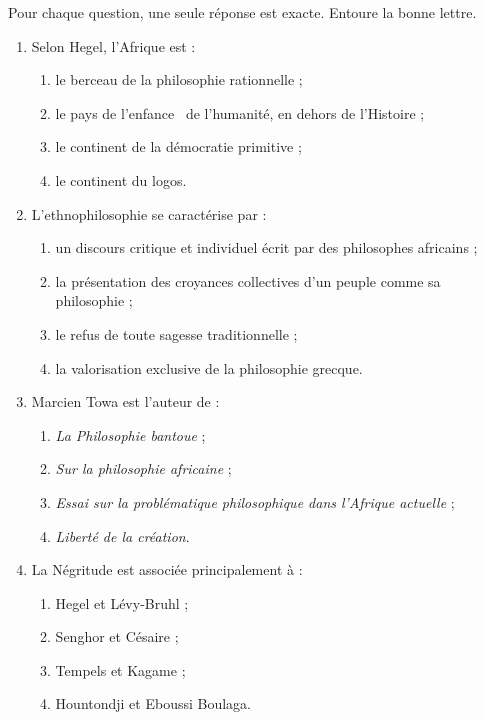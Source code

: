 \documentclass[11pt]{article}
\begin{document}
\begin{exercice}
Pour chaque question, une seule réponse est exacte. Entoure la bonne lettre.
\begin{enumerate}
\item Selon Hegel, l'Afrique est :
\begin{enumerate}
\item le berceau de la philosophie rationnelle ;
\item \guillemotleft le pays de l'enfance \guillemotright\ de l'humanité, en dehors de l'Histoire ;
\item le continent de la démocratie primitive ;
\item le continent du logos.
\end{enumerate}
\item L'ethnophilosophie se caractérise par :
\begin{enumerate}
\item un discours critique et individuel écrit par des philosophes africains ;
\item la présentation des croyances collectives d'un peuple comme sa \guillemotleft philosophie \guillemotright ;
\item le refus de toute sagesse traditionnelle ;
\item la valorisation exclusive de la philosophie grecque.
\end{enumerate}
\item Marcien Towa est l'auteur de :
\begin{enumerate}
\item \emph{La Philosophie bantoue} ;
\item \emph{Sur la \guillemotleft philosophie africaine \guillemotright} ;
\item \emph{Essai sur la problématique philosophique dans l'Afrique actuelle} ;
\item \emph{Liberté de la création}.
\end{enumerate}
\item La Négritude est associée principalement à :
\begin{enumerate}
\item Hegel et Lévy-Bruhl ;
\item Senghor et Césaire ;
\item Tempels et Kagame ;
\item Hountondji et Eboussi Boulaga.
\end{enumerate}
\end{enumerate}
\end{exercice}
\end{document}

